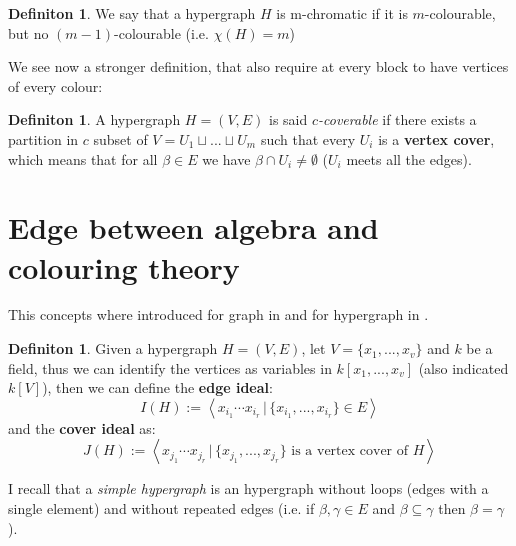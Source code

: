 \documentclass[a4wide]{book}
\theoremstyle{plain}
\theoremstyle{remark}
\theoremstyle{definition}
\newtheorem{deff}[teo]{Definiton}
\begin{document}
\begin{deff}
We say that a hypergraph $ H $ is m-chromatic if it is $ m $-colourable, but no $ (m-1) $-colourable (i.e. $\chi(H) = m  $)
\end{deff}

We see now a stronger definition, that also require at every block to have vertices of every colour:

\begin{deff} \label{def:cover}
A hypergraph $ H = (V,E) $ is said \textit{$ c $-coverable} if there exists a partition in $ c $ subset of $ V = U_1 \sqcup ... \sqcup U_m $ such that every $ U_i $ is a \textbf{vertex cover}, which means  that for all $ \beta \in E $ we have $ \beta \cap U_i \neq \emptyset $ ($ U_i $ meets all the edges). 
\end{deff}

\section{Edge between algebra and colouring theory}


This concepts where introduced for graph in \cite{Villa90} and for hypergraph in \cite{Ha08}.

\begin{deff}\label{def:edgecoverideal}
Given a hypergraph $ H = (V,E) $, let $ V = \{ x_1 , ... , x_v \} $ and $ k $ be a field, thus we can identify the vertices as variables in $ k[x_1 , ... , x_v] $ (also indicated $ k[V] $), then we can define the \textbf{edge ideal}:
\begin{equation}\label{eq:edgeideal}
I(H) := \left\langle x_{i_1} \cdots x_{i_r} \,|\, \{ x_{i_1} , ... , x_{i_r}\} \in E \right\rangle 
\end{equation}
and the \textbf{cover ideal} as:
\begin{equation}\label{eq:coverideal}
J(H) := \left\langle x_{j_1} \cdots x_{j_r} \,|\, \{ x_{j_1} , ... , x_{j_r}\} \text{ is a vertex cover of } H \right\rangle 
\end{equation}
\end{deff}

I recall that a \textit{simple hypergraph} is an hypergraph without loops (edges with a single element) and without repeated edges (i.e. if $ \beta, \gamma \in E$ and $ \beta \subseteq \gamma $ then $ \beta = \gamma $). 
\end{document}

